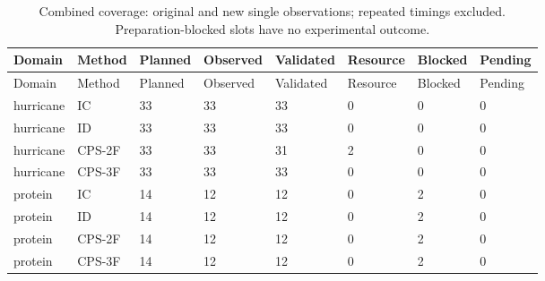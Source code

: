 \begingroup
\small
\begin{longtable}{llllllll}
\caption{Combined coverage: original and new single observations; repeated timings excluded. Preparation-blocked slots have no experimental outcome.}\label{tab:coverage-completion}\\
\toprule
Domain & Method & Planned & Observed & Validated & Resource & Blocked & Pending \\
\midrule
\endfirsthead
\toprule
Domain & Method & Planned & Observed & Validated & Resource & Blocked & Pending \\
\midrule
\endhead
hurricane & IC & 33 & 33 & 33 & 0 & 0 & 0 \\
hurricane & ID & 33 & 33 & 33 & 0 & 0 & 0 \\
hurricane & CPS-2F & 33 & 33 & 31 & 2 & 0 & 0 \\
hurricane & CPS-3F & 33 & 33 & 33 & 0 & 0 & 0 \\
protein & IC & 14 & 12 & 12 & 0 & 2 & 0 \\
protein & ID & 14 & 12 & 12 & 0 & 2 & 0 \\
protein & CPS-2F & 14 & 12 & 12 & 0 & 2 & 0 \\
protein & CPS-3F & 14 & 12 & 12 & 0 & 2 & 0 \\
\bottomrule
\end{longtable}
\endgroup
